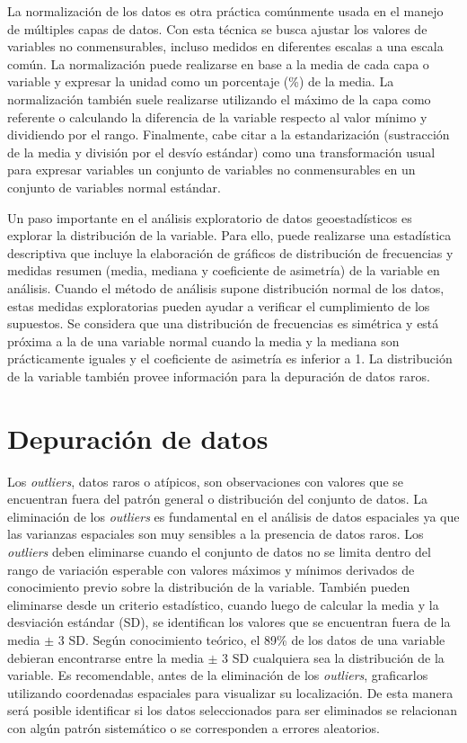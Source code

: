 \documentclass[11pt,b5paper,]{krantz}
\begin{document}
La normalización de los datos es otra práctica comúnmente usada en el
manejo de múltiples capas de datos. Con esta técnica se busca ajustar
los valores de variables no conmensurables, incluso medidos en
diferentes escalas a una escala común. La normalización puede realizarse
en base a la media de cada capa o variable y expresar la unidad como un
porcentaje (\%) de la media. La normalización también suele realizarse
utilizando el máximo de la capa como referente o calculando la
diferencia de la variable respecto al valor mínimo y dividiendo por el
rango. Finalmente, cabe citar a la estandarización (sustracción de la
media y división por el desvío estándar) como una transformación usual
para expresar variables un conjunto de variables no conmensurables en un
conjunto de variables normal estándar.

Un paso importante en el análisis exploratorio de datos geoestadísticos
es explorar la distribución de la variable. Para ello, puede realizarse
una estadística descriptiva que incluye la elaboración de gráficos de
distribución de frecuencias y medidas resumen (media, mediana y
coeficiente de asimetría) de la variable en análisis. Cuando el método
de análisis supone distribución normal de los datos, estas medidas
exploratorias pueden ayudar a verificar el cumplimiento de los
supuestos. Se considera que una distribución de frecuencias es simétrica
y está próxima a la de una variable normal cuando la media y la mediana
son prácticamente iguales y el coeficiente de asimetría es inferior a 1.
La distribución de la variable también provee información para la
depuración de datos raros.

\section{Depuración de datos}\label{depuraciuxf3n-de-datos}

Los \emph{outliers}, datos raros o atípicos, son observaciones con
valores que se encuentran fuera del patrón general o distribución del
conjunto de datos. La eliminación de los \emph{outliers} es fundamental
en el análisis de datos espaciales ya que las varianzas espaciales son
muy sensibles a la presencia de datos raros. Los \emph{outliers} deben
eliminarse cuando el conjunto de datos no se limita dentro del rango de
variación esperable con valores máximos y mínimos derivados de
conocimiento previo sobre la distribución de la variable. También pueden
eliminarse desde un criterio estadístico, cuando luego de calcular la
media y la desviación estándar (SD), se identifican los valores que se
encuentran fuera de la media \(\pm\) 3 SD. Según conocimiento teórico,
el 89\% de los datos de una variable debieran encontrarse entre la media
\(\pm\) 3 SD cualquiera sea la distribución de la variable. Es
recomendable, antes de la eliminación de los \emph{outliers},
graficarlos utilizando coordenadas espaciales para visualizar su
localización. De esta manera será posible identificar si los datos
seleccionados para ser eliminados se relacionan con algún patrón
sistemático o se corresponden a errores aleatorios.
\end{document}
